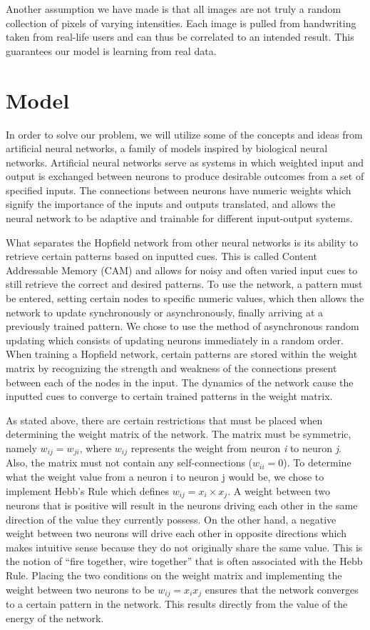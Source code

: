 \documentclass[]{article}
\theoremstyle{plain}
\theoremstyle{definition}
\begin{document}
Another assumption we have made is that all images are not truly a random collection of pixels of varying intensities.  Each image is pulled from handwriting taken from real-life users and can thus be correlated to an intended result.  This guarantees our model is learning from real data.


\section{Model}
In order to solve our problem, we will utilize some of the concepts and ideas from artificial neural networks, a family of models inspired by biological neural networks. Artificial neural networks serve as systems in which weighted input and output is exchanged between neurons to produce desirable outcomes from a set of specified inputs. The connections between neurons have numeric weights which signify the importance of the inputs and outputs translated, and allows the neural network to be adaptive and trainable for different input-output systems.


What separates the Hopfield network from other neural networks is its ability to retrieve certain patterns based on inputted cues. This is called Content Addressable Memory (CAM) and allows for noisy and often varied input cues to still retrieve the correct and desired patterns. To use the network, a pattern must be entered, setting certain nodes to specific numeric values, which then allows the network to update synchronously or asynchronously, finally arriving at a previously trained pattern. We chose to use the method of asynchronous random updating which consists of updating neurons immediately in a random order. When training a Hopfield network, certain patterns are stored within the weight matrix by recognizing the strength and weakness of the connections present between each of the nodes in the input. The dynamics of the network cause the inputted cues to converge to certain trained patterns in the weight matrix.  


As stated above, there are certain restrictions that must be placed when determining the weight matrix of the network. The matrix must be symmetric, namely $ w_{ij} = w_{ji} $, where $w_{ij}$ represents the weight from neuron \textit{i} to neuron \textit{j}. Also, the matrix must not contain any self-connections ($w_{ii} = 0$). To determine what the weight value from a neuron i to neuron j would be, we chose to implement Hebb's Rule which defines $w_{ij} = x_{i}\times x_{j}$. A weight between two neurons that is positive will result in the neurons driving each other in the same direction of the value they currently possess. On the other hand, a negative weight between two neurons will drive each other in opposite directions which makes intuitive sense because they do not originally share the same value. This is the notion of ``fire together, wire together'' that is often associated with the Hebb Rule. Placing the two conditions on the weight matrix and implementing the weight between two neurons to be $w_{ij} = x_{i}x_{j}$ ensures that the network converges to a certain pattern in the network. This results directly from the value of the energy of the network.
\end{document}
